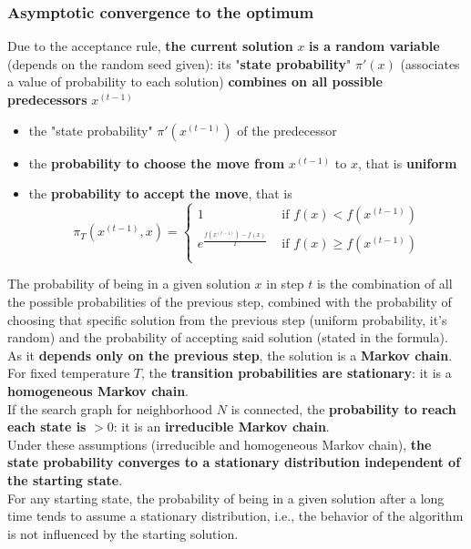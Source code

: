 \newpage

\subsubsection{Asymptotic convergence to the optimum}

Due to the acceptance rule, \textbf{the current solution} $x$ \textbf{is a random variable} (depends on the random seed given): its "\textbf{state probability}" $\pi' (x)$ (associates a value of probability to each solution) \textbf{combines on all possible predecessors} $x^{(t−1)}$ 
\begin{itemize}
	\item the "state probability" $\pi' (x^{(t−1)})$ of the predecessor
	
	\item the \textbf{probability to choose the move from} $x^{(t−1)}$ to $x$, that is \textbf{uniform}
	
	\item the \textbf{probability to accept the move}, that is
	$$ \pi_T \left(x^{(t-1)}, x\right) = \begin{cases}
		1 & \text{ if } f(x) < f \left(x^{(t-1)}\right) \\
		e^{\frac{f\left(x^{(t-1)}\right) - f(x)}{T}} & \text{ if } f(x) \geq f \left(x^{(t-1)}\right) \\
	\end{cases}$$
\end{itemize}

The probability of being in a given solution $x$ in step $t$ is the combination of all the possible probabilities of the previous step, combined with the probability of choosing that specific solution from the previous step (uniform probability, it's random) and the probability of accepting said solution (stated in the formula).\\

As it \textbf{depends only on the previous step}, the solution is a \textbf{Markov chain}.\\

For fixed temperature $T$, the \textbf{transition probabilities are stationary}: it is a \textbf{homogeneous Markov chain}.\\

If the search graph for neighborhood $N$ is connected, the \textbf{probability to reach each state is} $> 0$: it is an \textbf{irreducible Markov chain}.\\

Under these assumptions (irreducible and homogeneous Markov chain), \textbf{the state probability converges to a stationary distribution independent of the starting state}. \\
For any starting state, the probability of being in a given solution after a long time tends to assume a stationary distribution, i.e., the behavior of the algorithm is not influenced by the starting solution.\\


